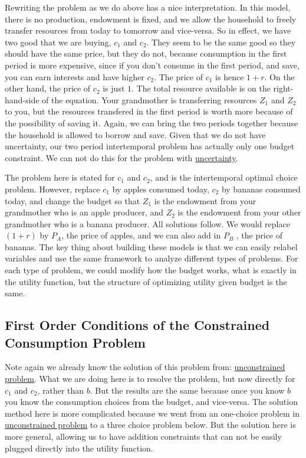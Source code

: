 \documentclass[
]{book}
\begin{document}
Rewriting the problem as we do above has a nice interpretation. In this
model, there is no production, endowment is fixed, and we allow the
household to freely transfer resources from today to tomorrow and
vice-versa. So in effect, we have two good that we are buying, \(c_1\) and
\(c_2\). They seem to be the same good so they should have the same price,
but they do not, because consumption in the first period is more
expensive, since if you don't consume in the first period, and save, you
can earn interests and have higher \(c_2\). The price of \(c_1\) is hence
\(1+r\). On the other hand, the price of \(c_2\) is just \(1\). The total
resource available is on the right-hand-side of the equation. Your
grandmother is transferring resources \(Z_1\) and \(Z_2\) to you, but the
resources transfered in the first period is worth more because of the
possibility of saving it. Again, we can bring the two periods together
because the household is allowed to borrow and save. Given that we do
not have uncertainty, our two period intertemporal problem has actually
only one budget constraint. We can not do this for the problem with
\href{https://fanwangecon.github.io/Math4Econ/nonlinear/RiskyAsset.html}{uncertainty}.

The problem here is stated for \(c_1\) and \(c_2\), and is the intertemporal
optimal choice problem. However, replace \(c_1\) by apples consumed today,
\(c_2\) by bananas consumed today, and change the budget so that \(Z_1\) is
the endowment from your grandmother who is an apple producer, and \(Z_2\)
is the endowment from your other grandmother who is a banana producer.
All solutions follow. We would replace \((1+r)\) by \(P_A\), the price of
apples, and we can also add in \(P_B\) , the price of bananas. The key
thing about building these models is that we can easily relabel
variables and use the same framework to analyze different types of
problems. For each type of problem, we could modify how the budget
works, what is exactly in the utility function, but the structure of
optimizing utility given budget is the same.

\hypertarget{first-order-conditions-of-the-constrained-consumption-problem}{%
\subsection{First Order Conditions of the Constrained Consumption Problem}\label{first-order-conditions-of-the-constrained-consumption-problem}}

Note again we already know the solution of this problem from:
\href{https://fanwangecon.github.io/Math4Econ/derivative_application/K_save_households.html}{unconstrained
problem}.
What we are doing here is to resolve the problem, but now directly for
\(c_1\) and \(c_2\), rather than \(b\). But the results are the same because
once you know \(b\) you know the consumption choices from the budget, and
vice-versa. The solution method here is more complicated because we went
from an one-choice problem in \href{https://fanwangecon.github.io/Math4Econ/derivative_application/K_save_households.html}{unconstrained
problem}
to a three choice problem below. But the solution here is more general,
allowing us to have addition constraints that can not be easily plugged
directly into the utility function.
\end{document}
